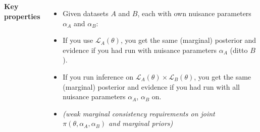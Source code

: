 \documentclass[aspectratio=169]{beamer}
\begin{document}
\begin{frame}
\begin{columns}[t]
        \textbf{Key properties}
        \begin{itemize}
            \item Given datasets $A$ and $B$, each with own nuisance parameters $\alpha_A$ and $\alpha_B$:
            \item If you use $\mathcal{L}_A(\theta)$, you get the same (marginal) posterior and evidence if you had run with nuisance parameters $\alpha_A$ (ditto $B$).
            \item If you run inference on $\mathcal{L}_A(\theta)\times\mathcal{L}_B(\theta)$, you get the same (marginal) posterior and evidence if you had run with all nuisance parameters $\alpha_A$, $\alpha_B$ on.
            \item[] \textit{(weak marginal consistency requirements on joint $\pi(\theta,\alpha_A,\alpha_B)$ and marginal priors)}
        \end{itemize}
    \end{columns}
\end{frame}
\end{document}
